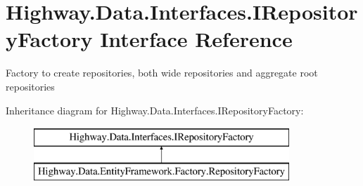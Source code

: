 \hypertarget{interface_highway_1_1_data_1_1_interfaces_1_1_i_repository_factory}{\section{Highway.\-Data.\-Interfaces.\-I\-Repository\-Factory Interface Reference}
\label{interface_highway_1_1_data_1_1_interfaces_1_1_i_repository_factory}
}


Factory to create repositories, both wide repositories and aggregate root repositories  


Inheritance diagram for Highway.\-Data.\-Interfaces.\-I\-Repository\-Factory\-:\begin{figure}[H]
\begin{center}
\leavevmode
\includegraphics[height=2.000000cm]{interface_highway_1_1_data_1_1_interfaces_1_1_i_repository_factory}
\end{center}
\end{figure}
